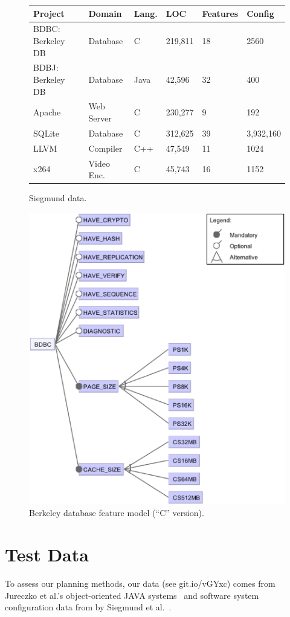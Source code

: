 \documentclass{sig-alternate}
\begin{document}
 \begin{figure}[!t]
\scriptsize
\begin{tabular}{llllll}
  \hline
  \rowcolor{lightgray}
Project & Domain & Lang. & LOC & Features & Config\\\hline
BDBC: Berkeley DB   & Database & C & 219,811 & 18 & 2560\\
BDBJ: Berkeley DB   & Database & Java & 42,596 & 32  & 400\\
Apache & Web Server & C & 230,277 & 9 & 192\\
SQLite & Database & C & 312,625 & 39 & 3,932,160\\
LLVM & Compiler & C++ & 47,549 & 11 & 1024\\
x264 & Video Enc. & C& 45,743 & 16 & 1152\\\hline
\end{tabular}
 
\caption{Siegmund data.}\label{fig:cpm}
\end{figure}

\begin{figure}[!t]
\includegraphics[width=0.9\linewidth]{figs/BDBC.eps}
\caption{ Berkeley database feature model   (``C'' version). }\label{fig:bdbc}
\end{figure}


 \section{Test Data}\label{sect:tesd}
To assess our planning methods, our data (see git.io/vGYxc) comes from Jureczko et al.'s object-oriented JAVA systems~\cite{jureczko10}  and
  software system   configuration data from by  Siegmund et al.~\cite{sven12}.
 
\end{document}
